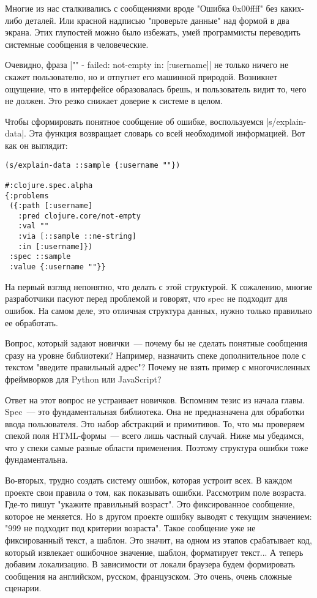 Многие из нас сталкивались с сообщениями вроде "Ошибка 0x00ffff" без каких-либо
деталей. Или красной надписью "проверьте данные" над формой в два экрана. Этих
глупостей можно было избежать, умей программисты переводить системные сообщения
в человеческие.

Очевидно, фраза \spverb|"" - failed: not-empty in: [:username]| не только ничего не
скажет пользователю, но и отпугнет его машинной природой. Возникнет ощущение,
что в интерфейсе образовалась брешь, и пользователь видит то, чего не
должен. Это резко снижает доверие к системе в целом.

Чтобы сформировать понятное сообщение об ошибке, воспользуемся
\spverb|s/explain-data|. Эта функция возвращает словарь со всей необходимой
информацией. Вот как он выглядит:

\begin{verbatim}
(s/explain-data ::sample {:username ""})

#:clojure.spec.alpha
{:problems
 ({:path [:username]
   :pred clojure.core/not-empty
   :val ""
   :via [::sample ::ne-string]
   :in [:username]})
 :spec ::sample
 :value {:username ""}}
\end{verbatim}

На первый взгляд непонятно, что делать с этой структурой. К сожалению, многие
разработчики пасуют перед проблемой и говорят, что spec не подходит для
ошибок. На самом деле, это отличная структура данных, нужно только правильно ее
обработать.

Вопрос, который задают новички~--- почему бы не сделать понятные сообщения сразу
на уровне библиотеки? Например, назначить спеке дополнительное поле с текстом
"введите правильный адрес"? Почему не взять пример с многочисленных фреймворков
для Python или JavaScript?

Ответ на этот вопрос не устраивает новичков. Вспомним тезис из начала
главы. Spec~--- это фундаментальная библиотека. Она не предназначена для обработки
ввода пользователя. Это набор абстракций и примитивов. То, что мы проверяем
спекой поля HTML-формы~--- всего лишь частный случай. Ниже мы убедимся, что у
спеки самые разные области применения. Поэтому структура ошибки тоже
фундаментальна.

Во-вторых, трудно создать систему ошибок, которая устроит всех. В каждом проекте
свои правила о том, как показывать ошибки. Рассмотрим поле возраста. Где-то
пишут "укажите правильный возраст". Это фиксированное сообщение, которое не
меняется. Но в другом проекте ошибку выводят с текущим значением: "999 не
подходит под критерии возраста". Такое сообщение уже не фиксированный текст, а
шаблон. Это значит, на одном из этапов срабатывает код, который извлекает
ошибочное значение, шаблон, форматирует текст... А теперь добавим локализацию. В
зависимости от локали браузера будем формировать сообщения на английском,
русском, французском. Это очень, очень сложные сценарии.

